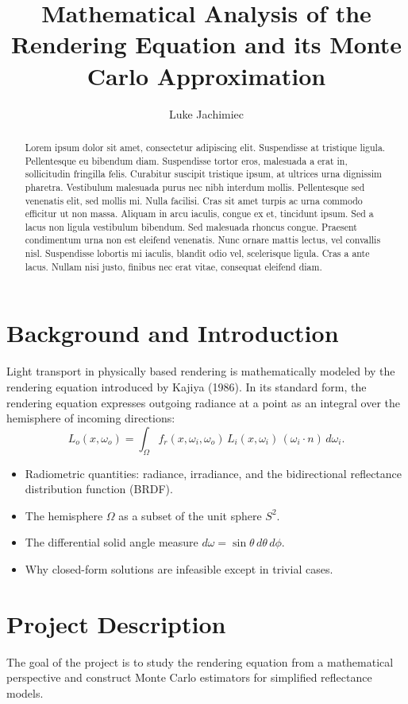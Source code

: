 \documentclass[12pt]{article}
\title{\textbf{Mathematical Analysis of the Rendering Equation and its Monte Carlo Approximation}}
\author{Luke Jachimiec}
\date{}
\begin{document}
\maketitle

\begin{abstract}
Lorem ipsum dolor sit amet, consectetur adipiscing elit. Suspendisse at tristique ligula. Pellentesque eu bibendum diam. Suspendisse tortor eros, malesuada a erat in, sollicitudin fringilla felis. Curabitur suscipit tristique ipsum, at ultrices urna dignissim pharetra. Vestibulum malesuada purus nec nibh interdum mollis. Pellentesque sed venenatis elit, sed mollis mi. Nulla facilisi. Cras sit amet turpis ac urna commodo efficitur ut non massa. Aliquam in arcu iaculis, congue ex et, tincidunt ipsum. Sed a lacus non ligula vestibulum bibendum. Sed malesuada rhoncus congue. Praesent condimentum urna non est eleifend venenatis. Nunc ornare mattis lectus, vel convallis nisl. Suspendisse lobortis mi iaculis, blandit odio vel, scelerisque ligula. Cras a ante lacus. Nullam nisi justo, finibus nec erat vitae, consequat eleifend diam.
\end{abstract}

\section{Background and Introduction}
Light transport in physically based rendering is mathematically modeled by the rendering equation introduced by Kajiya (1986). 
In its standard form, the rendering equation expresses outgoing radiance at a point as an integral over the hemisphere of incoming directions:
\[
L_o(x,\omega_o) = 
\int_{\Omega} 
f_r(x,\omega_i,\omega_o)\,
L_i(x,\omega_i)\,
(\omega_i \cdot n)\,
d\omega_i.
\]


\begin{itemize}
    \item Radiometric quantities: radiance, irradiance, and the bidirectional reflectance distribution function (BRDF).
    \item The hemisphere $\Omega$ as a subset of the unit sphere $S^2$.
    \item The differential solid angle measure $d\omega = \sin\theta\, d\theta\, d\phi$.
    \item Why closed-form solutions are infeasible except in trivial cases.
\end{itemize}


\section{Project Description}
The goal of the project is to study the rendering equation from a mathematical perspective and construct Monte Carlo estimators for simplified reflectance models.
\end{document}
